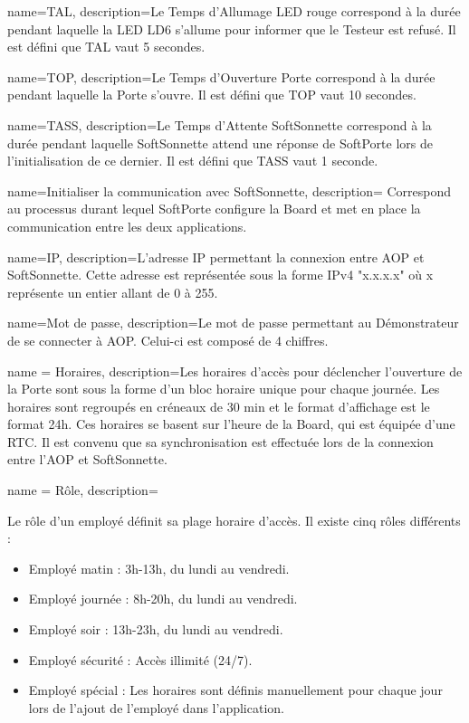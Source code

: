 {
    name={TAL},
    description={\hypertarget{tal}{}Le Temps d'Allumage LED rouge correspond à la durée pendant laquelle la LED LD6 s'allume pour informer que le Testeur est refusé. 
    Il est défini que TAL vaut 5 secondes.}
}

{
    name={TOP},
    description={\hypertarget{top}{}Le Temps d'Ouverture Porte correspond à la durée pendant laquelle la Porte s'ouvre. 
    Il est défini que TOP vaut 10 secondes.}
}

{
    name={TASS},
    description={\hypertarget{tass}{}Le Temps d'Attente SoftSonnette correspond à la durée pendant laquelle SoftSonnette attend une réponse de SoftPorte lors de l'initialisation de ce dernier. 
    Il est défini que TASS vaut 1 seconde.}
}

{
    name={Initialiser la communication avec SoftSonnette},
    description={\hypertarget{initComBoard}{} Correspond au processus durant lequel SoftPorte configure la Board et met en place la communication entre les deux applications.}
}

{
    name={IP},
    description={\hypertarget{IP}{L'adresse} IP permettant la connexion entre AOP et SoftSonnette. 
    Cette adresse est représentée sous la forme IPv4 "x.x.x.x" où x représente un entier allant de 0 à 255.}
}

{
    name={Mot de passe},
    description={\hypertarget{mdp}{Le} mot de passe permettant au Démonstrateur de se connecter à AOP. 
    Celui-ci est composé de 4 chiffres.}
}

{
    name = {Horaires},
    description={\hypertarget{hor}{}Les horaires d'accès pour déclencher l'ouverture de la Porte sont sous la forme d'un bloc horaire unique pour chaque journée. 
    Les horaires sont regroupés en créneaux de 30 min et le format d'affichage est le format 24h.
    Ces horaires se basent sur l'heure de la Board, qui est équipée d'une RTC.
    Il est convenu que sa synchronisation est effectuée lors de la connexion entre l'AOP et SoftSonnette.}
}

{
    name = {Rôle},
    description={\hypertarget{rol}{}Le rôle d'un employé définit sa plage horaire d'accès.
    Il existe cinq rôles différents : 
    \begin{itemize}
        \item Employé matin : 3h-13h, du lundi au vendredi.
        \item Employé journée : 8h-20h, du lundi au vendredi.
        \item Employé soir : 13h-23h, du lundi au vendredi.
        \item Employé sécurité : Accès illimité (24/7).
        \item Employé spécial : Les horaires sont définis manuellement pour chaque jour lors de l'ajout de l'employé dans l'application. 
    \end{itemize}
    }
}

